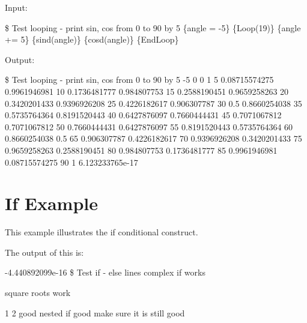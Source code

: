 Input:
\begin{apinp}
\$  Test  looping  -  print  sin,  cos  from  0  to  90  by  5
\{angle  =  -5\}
\{Loop(19)\}
\{angle  +=  5\}  \{sind(angle)\}  \{cosd(angle)\}
\{EndLoop\}
\end{apinp}
Output:
\begin{apout}
\$  Test  looping  -  print  sin,  cos  from  0  to 90  by  5
-5
 0  0    1
 5  0.08715574275 0.9961946981
10  0.1736481777  0.984807753
15  0.2588190451  0.9659258263
20  0.3420201433  0.9396926208
25  0.4226182617  0.906307787
30  0.5    0.8660254038
35  0.5735764364  0.8191520443
40  0.6427876097  0.7660444431
45  0.7071067812  0.7071067812
50  0.7660444431  0.6427876097
55  0.8191520443  0.5735764364
60  0.8660254038  0.5
65  0.906307787  0.4226182617
70  0.9396926208  0.3420201433
75  0.9659258263  0.2588190451
80  0.984807753  0.1736481777
85  0.9961946981  0.08715574275
90  1    6.123233765e-17
\end{apout}

\section{If Example}
This example illustrates the if conditional construct.


The output of this is:
\begin{apout}
-4.440892099e-16
\$ Test if - else lines
 complex if works

       square roots work

1 2
     good nested if
  good
  make sure it is still good
\end{apout}

